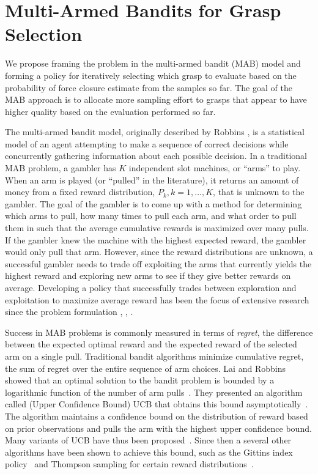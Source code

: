 \documentclass[journal,transmag]{IEEEtran}%
\begin{document}
\section{Multi-Armed Bandits for Grasp Selection}
We propose framing the problem in the multi-armed bandit (MAB) model and forming a policy for iteratively selecting which grasp to evaluate based on the probability of force closure estimate from the samples so far.
The goal of the MAB approach is to allocate more sampling effort to grasps that appear to have higher quality based on the evaluation performed so far.

The multi-armed bandit model, originally described by Robbins \cite{robbins1985some}, is a statistical model of an agent attempting to make a sequence of correct decisions while concurrently gathering information about each possible decision. In a traditional MAB problem, a gambler has $K$ independent slot machines, or ``arms'' to play.
When an arm is played (or ``pulled'' in the literature), it returns an amount of money from a fixed reward distribution, $P_k, k = 1, ..., K$, that is unknown to the gambler.
The goal of the gambler is to come up with a method for determining which arms to pull, how many times to pull each arm, and what order to pull them in such that the average cumulative rewards is maximized over many pulls.
If the gambler knew the machine with the highest expected reward, the gambler would only pull that arm.
However, since the reward distributions are unknown, a successful gambler needs to trade off exploiting the arms that currently yields the highest reward and exploring new arms to see if they give better rewards on average.
Developing a policy that successfully trades between exploration and exploitation to maximize average reward has been the focus of extensive research since the problem formulation \cite{bubeck2009pure}, \cite{robbins1985some}, \cite{bergemann2006bandit}.

Success in MAB problems is commonly measured in terms of {\it regret}, the difference between the expected optimal reward and the expected reward of the selected arm on a single pull.
Traditional bandit algorithms minimize cumulative regret, the sum of regret over the entire sequence of arm choices.
Lai and Robbins showed that an optimal solution to the bandit problem is bounded by a logarithmic function of the number of arm pulls~\cite{lai1985asymptotically}.
They presented an algorithm called (Upper Confidence Bound) UCB that obtains this bound asymptotically~\cite{lai1985asymptotically}.
The algorithm maintains a confidence bound on the distribution of reward based on prior observations and pulls the arm with the highest upper confidence bound.
Many variants of UCB have thus been proposed~\cite{}. 
Since then a several other algorithms have been shown to achieve this bound, such as the Gittins index policy~\cite{} and Thompson sampling for certain reward distributions~\cite{}.
\end{document}
